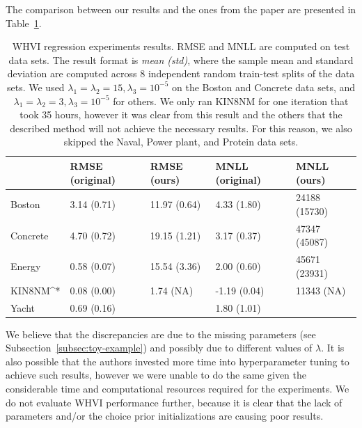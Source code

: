 The comparison between our results and the ones from the paper are presented in Table~\ref{tab:regression-experiments}.
\begin{table}[]
    \begin{tabular}{l|llll}
               & RMSE (original) & RMSE (ours) & { }MNLL (original) & MNLL (ours) \\ \hline
    Boston     & 3.14 (0.71)     & 11.97 (0.64) & { }4.33 (1.80)     & 24188 (15730) \\
    Concrete   & 4.70 (0.72)     & 19.15 (1.21) & { }3.17 (0.37)     & 47347 (45087) \\
    Energy     & 0.58 (0.07)     & 15.54 (3.36) & { }2.00 (0.60)     & 45671 (23931) \\
    KIN8NM^*   & 0.08 (0.00)     & { }1.74 (NA) & -1.19 (0.04)       & 11343 (NA) \\
    Yacht      & 0.69 (0.16)     &              & { }1.80 (1.01)     &
    \end{tabular}
    \caption{
        WHVI regression experiments results.
        RMSE and MNLL are computed on test data sets.
        The result format is \textit{mean (std)}, where the sample mean and standard deviation are computed across 8 independent random train-test splits of the data sets.
        We used $\lambda_1=\lambda_2=15,\lambda_3=10^{-5}$ on the Boston and Concrete data sets, and $\lambda_1=\lambda_2=3,\lambda_3=10^{-5}$ for others.
        We only ran KIN8NM for one iteration that took 35 hours, however it was clear from this result and the others that the described method will not achieve the necessary results.
        For this reason, we also skipped the Naval, Power plant, and Protein data sets.
    }
    \label{tab:regression-experiments}
\end{table}

We believe that the discrepancies are due to the missing parameters (see Subsection~\ref{subsec:toy-example}) and possibly due to different values of $\lambda$.
It is also possible that the authors invested more time into hyperparameter tuning to achieve such results, however we were unable to do the same given the considerable time and computational resources required for the experiments.
We do not evaluate WHVI performance further, because it is clear that the lack of parameters and/or the choice prior initializations are causing poor results.
